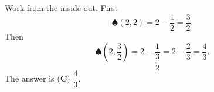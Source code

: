 Work from the inside out. First
\[\spadesuit(2,2)=2-\dfrac{1}{2}=\dfrac{3}{2} .\]
Then
\[\spadesuit\left(2,\dfrac{3}{2}\right)=2-\dfrac{1}{\dfrac{3}{2}}=2-\dfrac{2}{3}=\dfrac{4}{3} .\]
The answer is $\boxed{\textbf{(C) }\dfrac{4}{3}}$.
